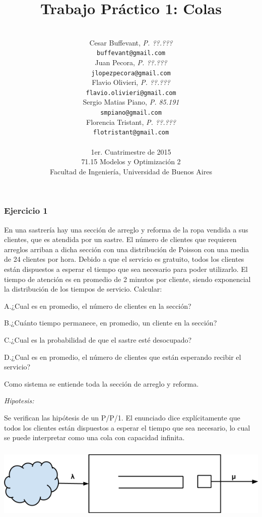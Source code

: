 \documentclass[a4paper,11pt]{article}
\title{\textbf{Trabajo Práctico 1: Colas}}
\author{\\
  Cesar Buffevant, \textit{P. ??.???}                              \\
  \texttt{buffevant@gmail.com}                                     \\ [2.5ex]
  Juan Pecora, \textit{P. ??.???}                                  \\
  \texttt{jlopezpecora@gmail.com}                                  \\ [2.5ex]
  Flavio Olivieri, \textit{P. ??.???}                              \\
  \texttt{flavio.olivieri@gmail.com}                               \\ [2.5ex]
  Sergio Matias Piano, \textit{P. 85.191}                          \\
  \texttt{smpiano@gmail.com}                                       \\ [2.5ex]
  Florencia Tristant, \textit{P. ??.???}                           \\
  \texttt{flotristant@gmail.com}                                   \\ [2.5ex]
                                                                   \\
  \normalsize{1er. Cuatrimestre de 2015}                           \\
  \normalsize{71.15 Modelos y Optimización 2}                      \\
  \normalsize{Facultad de Ingeniería, Universidad de Buenos Aires} \\
}
\date{}
\newcommand{\tab}{\hspace{5mm}}
\begin{document}
\thispagestyle{empty}
\maketitle

\clearpage

\vspace{8pt}
\subsubsection*{{\color{color01} \textbf{Ejercicio 1}}}

\baselineskip=13pt
En una sastrería hay una sección de arreglo y reforma de la ropa vendida a sus 
clientes, que es atendida por un sastre. El número de clientes que requieren arreglos 
arriban a dicha sección con una distribución de Poisson con una media de 24 clientes 
por hora. Debido a que el servicio es gratuito, todos los clientes están dispuestos 
a esperar el tiempo que sea necesario para poder utilizarlo. El tiempo de atención 
es en promedio de 2 minutos por cliente, siendo exponencial la distribución de 
los tiempos de servicio. Calcular:

\leftskip=36pt
\parindent=-18pt
A.\tab ¿Cual es en promedio, el número de clientes en la sección?

B.\tab ¿Cuánto tiempo permanece, en promedio, un cliente en la sección?

C.\tab ¿Cual es la probabilidad de que el sastre esté desocupado?

D.\tab ¿Cual es en promedio, el número de clientes que están esperando recibir 
el servicio?

\vspace{13pt}
\leftskip=0pt
\parindent=0pt
Como sistema se entiende toda la sección de arreglo y reforma.\label{h.ucd2riukxd97}

\vspace{8pt}
{\color{color01} \emph{Hipotesis:}}

Se verifican las hipótesis de un P/P/1. El enunciado dice explícitamente que 
todos los clientes están dispuestos a esperar el tiempo que sea necesario, lo 
cual se puede interpretar como una cola con capacidad infinita.

\vspace{13pt}
\includegraphics[width=441pt, height=101pt, keepaspectratio=true]{TP1-Colas-fig001.png}
\end{document}
